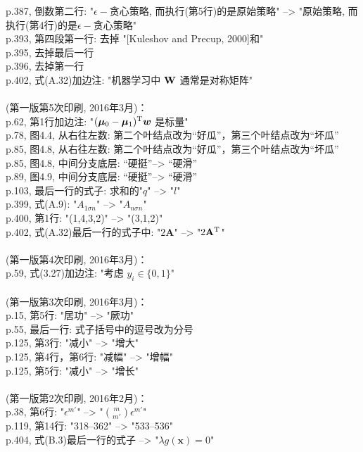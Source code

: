 \documentclass[UTF8]{article}
\begin{document}
p.387, 倒数第二行: "$\epsilon-$贪心策略, 而执行(第5行)的是原始策略" --> "原始策略, 而执行(第4行)的是$\epsilon-$贪心策略" \\
p.393, 第四段第一行: 去掉 "[Kuleshov and Precup, 2000]和" \\
p.395, 去掉最后一行 \\
p.396, 去掉第一行 \\
p.402, 式(A.32)加边注: "机器学习中 $\bf W$ 通常是对称矩阵" \\
\\
(第一版第5次印刷, 2016年3月)：
\\
p.62, 第1行加边注: "$(\bm{\mu}_0 - \bm{\mu}_1)^{\rm T} \bm{w}$ 是标量" \\
p.78, 图4.4, 从右往左数: 第二个叶结点改为“好瓜”，第三个叶结点改为“坏瓜” \\
p.85, 图4.8, 从右往左数: 第二个叶结点改为“好瓜”，第三个叶结点改为“坏瓜” \\
p.85, 图4.8, 中间分支底层: “硬挺”--> “硬滑” \\
p.89, 图4.9, 中间分支底层: “硬挺”--> “硬滑” \\
p.103, 最后一行的式子: 求和的"$q$" --> "$l$" \\
p.399, 式(A.9): "$A_{1 \sigma n}$" --> "$A_{n \sigma n}$" \\
p.400, 第1行: "(1,4,3,2)" --> "(3,1,2)" \\
p.402, 式(A.32)最后一行的式子中: "$2{\mathbf A}$" --> "$2{\mathbf A}^{\rm T}$" \\
\\
(第一版第4次印刷, 2016年3月)：
\\
p.59, 式(3.27)加边注: "考虑 $y_i \in \{0, 1\}$" \\
\\
(第一版第3次印刷, 2016年3月)：
\\
p.15, 第5行: "居功" --> "厥功" \\
p.55, 最后一行: 式子括号中的逗号改为分号 \\
p.125, 第3行: "减小" --> "增大" \\
p.125, 第4行，第6行: "减幅" --> "增幅" \\
p.125, 第5行: "减小" --> "增长" \\
\\
(第一版第2次印刷, 2016年2月)：
\\
p.38, 第6行: "$\epsilon^{m'}$" --> "${m \choose m'} \epsilon^{m'}$" \\
p.119, 第14行: "318--362" --> "533--536" \\
p.404, 式(B.3)最后一行的式子 --> "$\lambda g({\bm x})=0$" \\
\end{document}
